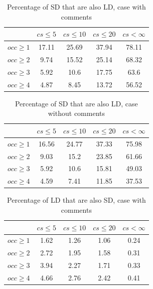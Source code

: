 \documentclass[a4paper,twoside]{article}
\begin{document}
\begin{table}[!h]
\renewcommand{\arraystretch}{1.25}
\caption{Percentage of SD that are also LD, case with comments}
\label{tab:percSD:comm}
\centering

\begin{tabular}{|c|c|c|c|c|}
\hline
	      &	$cs\leq 5$	&	$cs\leq 10$	&	$cs\leq 20$	&	$cs< \infty$	\\
\hline
$occ\geq 1$	&	17.11	&	25.69	&	37.94	&	78.11	\\
$occ\geq 2$	&	9.74	&	15.52	&	25.14	&	68.32	\\
$occ\geq 3$	&	5.92	&	10.6	&	17.75	&	63.6	\\
$occ\geq 4$	&	4.87	&	8.45	&	13.72	&	56.52	\\
\hline
\end{tabular}
\end{table}


\begin{table}[!h]
\renewcommand{\arraystretch}{1.25}
\caption{Percentage of SD that are also LD, case without comments}
\label{tab:percSD:nocomm}
\centering

\begin{tabular}{|c|c|c|c|c|}
\hline
	      &	$cs\leq 5$	&	$cs\leq 10$	&	$cs\leq 20$	&	$cs< \infty$	\\
\hline
$occ\geq 1$	&	16.56	&	24.77	&	37.33	&	75.98	\\
$occ\geq 2$	&	9.03	&	15.2	&	23.85	&	61.66	\\
$occ\geq 3$	&	5.92	&	10.6	&	15.81	&	49.03	\\
$occ\geq 4$	&	4.59	&	7.41	&	11.85	&	37.53	\\
\hline
\end{tabular}
\end{table}


\begin{table}[!h]
\renewcommand{\arraystretch}{1.25}
\caption{Percentage of LD that are also SD, case with comments}
\label{tab:percLD:comm}
\centering

\begin{tabular}{|c|c|c|c|c|}
\hline
	      &	$cs\leq 5$	&	$cs\leq 10$	&	$cs\leq 20$	&	$cs< \infty$	\\
\hline
$occ\geq 1$	&	1.62	&	1.26	&	1.06	&	0.24	\\
$occ\geq 2$	&	2.72	&	1.95	&	1.58	&	0.31	\\
$occ\geq 3$	&	3.94	&	2.27	&	1.71	&	0.33	\\
$occ\geq 4$	&	4.66	&	2.76	&	2.42	&	0.41	\\
\hline
\end{tabular}
\end{table}
\end{document}
